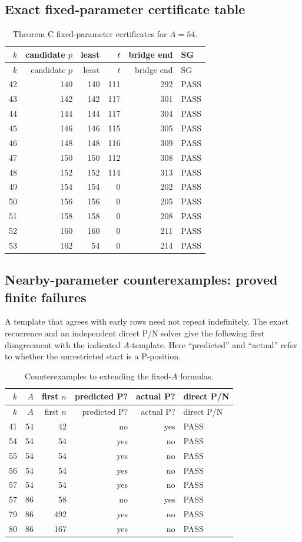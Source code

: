 \subsection{Exact fixed-parameter certificate table}
\begin{longtable}{rrrrrl}
\caption{Theorem C fixed-parameter certificates for $A=54$.}\label{tab:Ccert}\\
\toprule $k$ & candidate $p$ & least & $t$ & bridge end & SG \\
\midrule\endfirsthead\toprule $k$ & candidate $p$ & least & $t$ & bridge end & SG \\
\midrule\endhead
42 & 140 & 140 & 111 & 292 & PASS \\
43 & 142 & 142 & 117 & 301 & PASS \\
44 & 144 & 144 & 117 & 304 & PASS \\
45 & 146 & 146 & 115 & 305 & PASS \\
46 & 148 & 148 & 116 & 309 & PASS \\
47 & 150 & 150 & 112 & 308 & PASS \\
48 & 152 & 152 & 114 & 313 & PASS \\
49 & 154 & 154 & 0 & 202 & PASS \\
50 & 156 & 156 & 0 & 205 & PASS \\
51 & 158 & 158 & 0 & 208 & PASS \\
52 & 160 & 160 & 0 & 211 & PASS \\
53 & 162 & 54 & 0 & 214 & PASS \\
\bottomrule\end{longtable}
\subsection{Nearby-parameter counterexamples: proved finite failures}
A template that agrees with early rows need not repeat indefinitely. The exact recurrence and an independent direct P/N solver give the following first disagreement with the indicated $A$-template. Here ``predicted'' and ``actual'' refer to whether the unrestricted start is a P-position.
\begin{longtable}{rrrrrl}
\caption{Counterexamples to extending the fixed-$A$ formulas.}\label{tab:Cfail}\\
\toprule $k$ & $A$ & first $n$ & predicted P? & actual P? & direct P/N \\
\midrule\endfirsthead\toprule $k$ & $A$ & first $n$ & predicted P? & actual P? & direct P/N \\
\midrule\endhead
41 & 54 & 42 & no & yes & PASS \\
54 & 54 & 54 & yes & no & PASS \\
55 & 54 & 54 & yes & no & PASS \\
56 & 54 & 54 & yes & no & PASS \\
57 & 54 & 54 & yes & no & PASS \\
57 & 86 & 58 & no & yes & PASS \\
79 & 86 & 492 & yes & no & PASS \\
80 & 86 & 167 & yes & no & PASS \\
\bottomrule\end{longtable}
